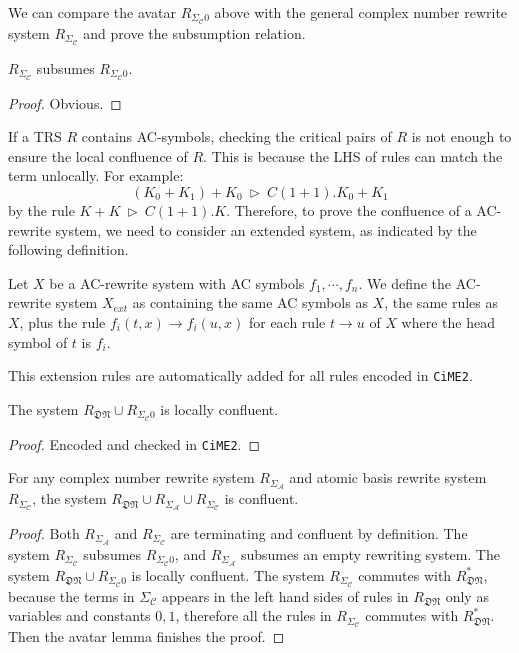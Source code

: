 \documentclass[manuscript, review, timestamp]{acmart}
\newcommand*{\reduce}{\ \triangleright\ }
\begin{document}
We can compare the avatar $R_{\Sigma_\mathcal{C}0}$ above with the general complex number rewrite system $R_{\Sigma_\mathcal{C}}$ and prove the subsumption relation.

\begin{proposition}
  $R_{\Sigma_\mathcal{C}}$ subsumes $R_{\Sigma_\mathcal{C}0}$.
\end{proposition}

\begin{proof}
  Obvious.
\end{proof}


If a TRS $R$ contains AC-symbols, checking the critical pairs of $R$ is not enough to ensure the local confluence of $R$. This is because the LHS of rules can match the term unlocally. For example:
$$
(K_0 + K_1) + K_0 \reduce C(1 + 1).K_0 + K_1
$$
by the rule $ K + K \reduce C(1 + 1).K$. Therefore, to prove the confluence of a AC-rewrite system, we need to consider an extended system, as indicated by the following definition.

\begin{definition}
  Let $X$ be a AC-rewrite system with AC symbols $f_1, \cdots, f_n$. We define the AC-rewrite system $X_{ext}$ as containing the same AC symbols as $X$, the same rules as $X$, plus the rule $f_i(t, x) \to f_i(u, x)$ for each rule $t \to u$ of $X$ where the head symbol of $t$ is $f_i$.
\end{definition}

This extension rules are automatically added for all rules encoded in \texttt{CiME2}.

\begin{proposition}
  The system $R_\mathfrak{DN} \cup R_{\Sigma_\mathcal{C}0}$ is locally confluent.
\end{proposition}
\begin{proof}
  Encoded and checked in \texttt{CiME2}.
\end{proof}


\begin{lemma}
  For any complex number rewrite system $R_{\Sigma_\mathcal{A}}$ and atomic basis rewrite system $R_{\Sigma_\mathcal{C}}$, the system $R_\mathfrak{DN} \cup R_{\Sigma_\mathcal{A}} \cup R_{\Sigma_\mathcal{C}}$ is confluent.
\end{lemma}
\begin{proof}
  Both $R_{\Sigma_\mathcal{A}}$ and $R_{\Sigma_\mathcal{C}}$ are terminating and confluent by definition. 
  The system $R_{\Sigma_\mathcal{C}}$ subsumes $R_{\Sigma_\mathcal{C}0}$, and $R_{\Sigma_\mathcal{A}}$ subsumes an empty rewriting system. 
  The system $R_\mathfrak{DN} \cup R_{\Sigma_\mathcal{C}0}$ is locally confluent. 
  The system $R_{\Sigma_\mathcal{C}}$ commutes with $R_\mathfrak{DN}^*$, because the terms in $\Sigma_\mathcal{C}$ appears in the left hand sides of rules in $R_\mathfrak{DN}$ only as variables and constants $0, 1$, therefore all the rules in $R_{\Sigma_\mathcal{C}}$ commutes with $R_\mathfrak{DN}^*$. 
  Then the avatar lemma finishes the proof.
\end{proof}
\end{document}
